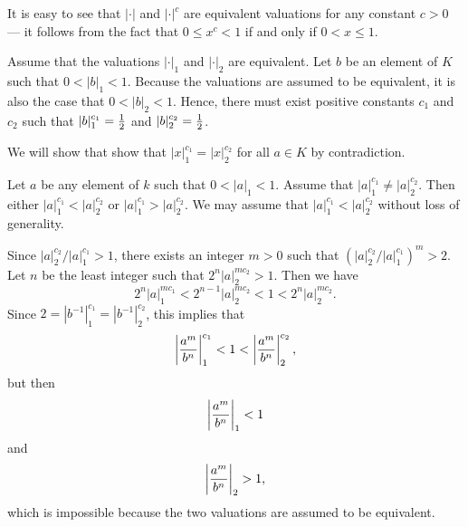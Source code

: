 \documentclass[12pt]{article}
\begin{document}
It is easy to see that $| \cdot |$ and $| \cdot |^c$ are equivalent valuations for any constant $c > 0$ --- it follows from the fact that $0 \le x^c < 1$ if and only if $0 < x \le 1$.

Assume that the valuations $| \cdot |_1$ and $| \cdot |_2$ are equivalent.  
Let $b$ be an element of $K$ such that $0 < |b|_1 < 1$.  Because the valuations are assumed to be equivalent, it is also the case that $0 < |b|_2 < 1$.  Hence, there must exist positive constants $c_1$ and $c_2$ such that $|b|_1^{c_1} = {1 \over 2}$ and $|b|_2^{c_2} = {1 \over 2}$.  

We will show that show that $| x |_1^{c_1} = | x |_2^{c_2}$ for all $a \in K$ by contradiction.

Let $a$ be any element of $k$ such that $0 < |a|_1 < 1$.  Assume that $| a |_1^{c_1} \neq | a |_2^{c_2}$.  Then either $| a |_1^{c_1} < | a |_2^{c_2}$ or $| a |_1^{c_1} > | a |_2^{c_2}$.  We may assume that $| a |_1^{c_1} < | a |_2^{c_2}$ without loss of generality.

Since $| a |_2^{c_2} / | a |_1^{c_1} > 1$, there exists an integer $m > 0$ such that $(| a |_2^{c_2} / | a |_1^{c_1})^m > 2$.  Let $n$ be the least integer such that $2^n |a|_2^{m c_2} > 1$.  Then we have
 $$2^n |a|_1^{m c_1} < 2^{n-1} |a|_2^{m c_2} < 1 < 2^n |a|_2^{m c_2}.$$
Since $2 = |b^{-1}|_1^{c_1} = |b^{-1}|_2^{c_2}$, this implies that
 $$\left| {a^m \over b^n} \right|_1^{c_1} < 1 < \left| {a^m \over b^n} \right|_2^{c_2},$$
but then
 $$\left| {a^m \over b^n} \right|_1 < 1$$
and
 $$\left| {a^m \over b^n} \right|_2 > 1,$$
which is impossible because the two valuations are assumed to be equivalent.
\end{document}
